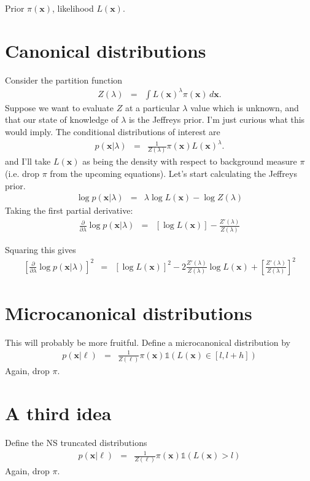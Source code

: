 \documentclass[a4paper, 11pt]{article}
\newcommand{\xx}{\boldsymbol{x}}	%
\begin{document}
Prior $\pi(\xx)$, likelihood $L(\xx)$.

\section{Canonical distributions}
Consider the partition function
\begin{eqnarray}
Z(\lambda) &=& \int L(\xx)^\lambda \pi(\xx) \, d\xx.
\end{eqnarray}
Suppose we want to evaluate $Z$ at a particular $\lambda$ value which is
unknown, and that our state of knowledge of $\lambda$ is the Jeffreys prior.
I'm just curious what this would imply. The conditional distributions of
interest are
\begin{eqnarray}
p(\xx | \lambda) &=& \frac{1}{Z(\lambda)}\pi(\xx)L(\xx)^\lambda.
\end{eqnarray}
and I'll take $L(\xx)$ as being the density with respect to background measure
$\pi$ (i.e. drop $\pi$ from the upcoming equations).
Let's start calculating the Jeffreys prior.
\begin{eqnarray}
\log p(\xx | \lambda) &=&  \lambda \log L(\xx) - \log Z(\lambda)
\end{eqnarray}
Taking the first partial derivative:
\begin{eqnarray}
\frac{\partial}{\partial \lambda}
\log p(\xx | \lambda) &=&
\left[\log L(\xx)\right] - \frac{Z'(\lambda)}{Z(\lambda)}
\end{eqnarray}

Squaring this gives
\begin{eqnarray}
\left[\frac{\partial}{\partial \lambda}
\log p(\xx | \lambda)\right]^2 &=&
\left[\log L(\xx)\right]^2 - 2\frac{Z'(\lambda)}{Z(\lambda)}\log L(\xx)
+ \left[\frac{Z'(\lambda)}{Z(\lambda)}\right]^2
\end{eqnarray}



\section{Microcanonical distributions}
This will probably be more fruitful. Define a microcanonical distribution by
\begin{eqnarray}
p(\xx | \ell) &=& \frac{1}{Z(\ell)}\pi(\xx)\mathds{1}
\left(L(\xx) \in [l, l + h]\right)
\end{eqnarray}
Again, drop $\pi$. 


\section{A third idea}
Define the NS truncated distributions
\begin{eqnarray}
p(\xx | \ell) &=& \frac{1}{Z(\ell)}\pi(\xx)\mathds{1}
\left(L(\xx) > l\right)
\end{eqnarray}
Again, drop $\pi$. 
\end{document}
